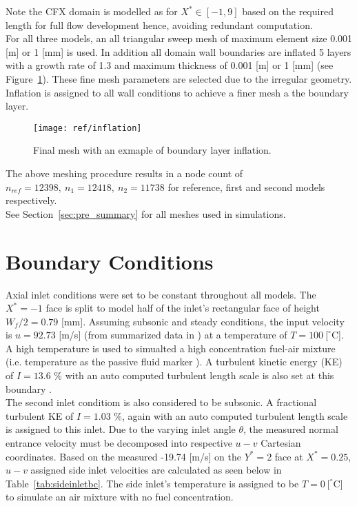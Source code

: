 Note the CFX domain is modelled as for $X^* \in [-1,9]$ based on the required length for full flow development \cite{art} hence, avoiding redundant computation.\\


For all three models, an all triangular sweep mesh of maximum element size 0.001 [m] or 1 [mm] is used. In addition all domain wall boundaries are inflated 5 layers with a growth rate of 1.3 and maximum thickness of 0.001 [m] or 1 [mm] (see Figure~\ref{fig:inflation}). These fine mesh parameters are selected due to the irregular geometry. Inflation is assigned to all wall conditions to achieve a finer mesh a the boundary layer.

\begin{figure}[H]
	\centering
	\texttt{[image: ref/inflation]}
	\caption[Final mesh with an exmaple of boundary layer inflation.]{Final mesh with an exmaple of  boundary layer inflation.\cite{cfx}}
	\label{fig:inflation}
\end{figure}

The above meshing procedure results in a node count of $n_{ref}= 12398,\ n_1= 12418,\ n_2=11738$ for reference, first and second models respectively.\\

See Section~\ref{sec:pre_summary} for all meshes used in \cite{cfx} simulations.

\section{Boundary Conditions}
\label{sec:pre_bc}

Axial inlet conditions were set to be constant throughout all models. The $X^*=-1$ face is split to model half of the inlet's rectangular face of height $W_f/2=0.79$ [mm]. Assuming subsonic and steady conditions, the input velocity is $u=92.73$ [m/s] (from summarized \cite{art} data in \cite{projfaq}) at a temperature of $T=100\ [ ^{\circ}$C]. A high temperature is used to simualted a high concentration fuel-air mixture (i.e. temperature as the passive fluid marker \cite{proj}). A turbulent kinetic energy (KE) of $I=13.6$ \% with an auto computed turbulent length scale is also set at this boundary \cite{projfaq}.\\

The second inlet conditiom is also considered to be subsonic. A fractional turbulent KE of $I=1.03$ \%, again with an auto computed turbulent length scale \cite{projfaq} is assigned to this inlet. Due to the varying inlet angle $\theta$, the measured normal entrance velocity must be decomposed into respective $u-v$ Cartesian coordinates. Based on the measured -19.74 [m/s] on the $Y^*=2$ face at $X^*=0.25$, $u-v$ assigned side inlet velocities are calculated as seen below in Table~\ref{tab:sideinletbc}. The side inlet's temperature is assigned to be $T=0\ [ ^{\circ}$C] to simulate an air mixture with no fuel concentration.
 

